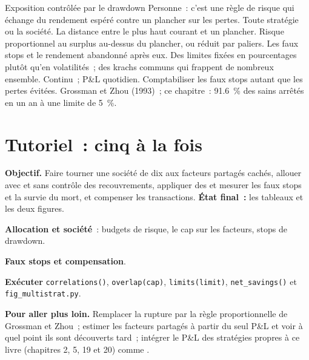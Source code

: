 \begin{strategyfile}{Exposition contrôlée par le drawdown}\label{strat:s1:running-a-multi-strategy-book:drawdown}
 Personne~: c'est une règle de risque qui échange du rendement espéré contre un plancher sur les pertes.
 Toute stratégie ou la société.
 La distance entre le plus haut courant et un plancher.
 Risque proportionnel au surplus au-dessus du plancher, ou réduit par paliers.
 Les faux stops et le rendement abandonné après eux.
 Des limites fixées en pourcentages plutôt qu'en volatilités~; des krachs communs qui frappent de nombreux  ensemble.
 Continu~; P\&L quotidien.
 Comptabiliser les faux stops autant que les pertes évitées.
 Grossman et Zhou (1993)~; ce chapitre~: 91.6~\% des  sains arrêtés en un an à une limite de 5~\%.
\end{strategyfile}

\section{Tutoriel~: cinq à la fois}\label{tut:s1:running-a-multi-strategy-book:tut}

\begin{tutorial}
\textbf{Objectif.} Faire tourner une société de dix  aux facteurs partagés cachés, allouer avec et sans contrôle des recouvrements, appliquer des  et mesurer les faux
stops et la survie du  mort, et compenser les transactions. \textbf{État final~:} les tableaux et les deux figures.
\begin{tutsteps}
\item \textbf{Allocation et société}~: budgets de risque, le cap sur les facteurs, stops de drawdown.
\label{lst:s1:running-a-multi-strategy-book:firm}
\item \textbf{Faux stops et compensation}.
\label{lst:s1:running-a-multi-strategy-book:stops}
\item \textbf{Exécuter} \texttt{correlations()}, \texttt{overlap(cap)}, \texttt{limits(limit)}, \texttt{net\_savings()} et \texttt{fig\_multistrat.py}.
\end{tutsteps}
\textbf{Pour aller plus loin.} Remplacer la rupture par la règle proportionnelle de Grossman et Zhou~; estimer les facteurs partagés à partir du seul P\&L et voir
à quel point ils sont découverts tard~; intégrer le P\&L des stratégies propres à ce livre (chapitres 2, 5, 19 et 20) comme .
\end{tutorial}

